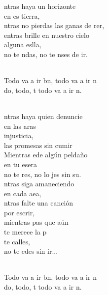 \begin{cancion}%
	ntras haya un horizonte \\
	en es tierra,\\
	ntras no pierdas las ganas de rer,\\
	entras brille en nuestro cielo\\
	alguna eslla,\\
	no te ndas, no te nses de ir.\\\jump\\
	\begin{chorus}%
	Todo va a ir bn, todo va a ir n\\
	do, todo, t todo va a ir n.\\
	\end{chorus}%
	\jump\\
	ntras haya quien denuncie \\
	en las aras\\
	injusticia, \\
	las promesas sin cumir\\
	Mientras ede algún peldaño \\
	en tu esera\\
	no te res, no lo jes sin su.\\
	ntras siga amaneciendo\\
	en cada aea,\\
	ntras falte una canción\\
	por escrir,\\
	mientras pas que aún\\
	te merece la p\\
	 te calles, \\
	no te edes sin ir...\\\jump\\
	\begin{chorus}%
	Todo va a ir bn, todo va a ir n\\
	do, todo, t todo va a ir n.\\

\end{chorus}
\end{cancion}
